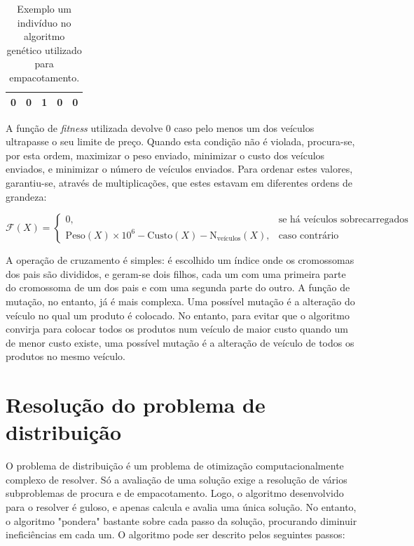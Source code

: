 \documentclass[12pt, a4paper, titlepage]{article}
\begin{document}
\begin{table}[H]
    \begin{center}
        \begin{tabular}{|c|c|c|c|c|}
            \hline 0 & 0 & 1 & 0 & 0 \\ \hline
        \end{tabular}

        \caption{Exemplo um indivíduo no algoritmo genético utilizado para empacotamento.}
    \end{center}
\end{table}

A função de \emph{fitness} utilizada devolve 0 caso pelo menos um dos veículos ultrapasse o seu
limite de preço. Quando esta condição não é violada, procura-se, por esta ordem, maximizar o
peso enviado, minimizar o custo dos veículos enviados, e minimizar o número de veículos enviados.
Para ordenar estes valores, garantiu-se, através de multiplicações, que estes estavam em diferentes
ordens de grandeza:

$$
\mathcal{F}(X) =
\begin{cases}
    0
        ,& \text{se há veículos sobrecarregados} \\
    \text{Peso}(X) \times 10^6 - \text{Custo}(X) - \text{N}_\text{veículos}(X)
        ,& \text{caso contrário}
\end{cases}
$$

A operação de cruzamento é simples: é escolhido um índice onde os cromossomas dos pais são
divididos, e geram-se dois filhos, cada um com uma primeira parte do cromossoma de um dos pais e com
uma segunda parte do outro. A função de mutação, no entanto, já é mais complexa. Uma possível
mutação é a alteração do veículo no qual um produto é colocado. No entanto, para evitar que o
algoritmo convirja para colocar todos os produtos num veículo de maior custo quando um de menor
custo existe, uma possível mutação é a alteração de veículo de todos os produtos no mesmo veículo.

\section{Resolução do problema de distribuição}

O problema de distribuição é um problema de otimização computacionalmente complexo de resolver. Só a
avaliação de uma solução exige a resolução de vários subproblemas de procura e de empacotamento.
Logo, o algoritmo desenvolvido para o resolver é guloso, e apenas calcula e avalia uma única
solução. No entanto, o algoritmo "pondera"{} bastante sobre cada passo da solução, procurando
diminuir ineficiências em cada um. O algoritmo pode ser descrito pelos seguintes passos:
\end{document}
